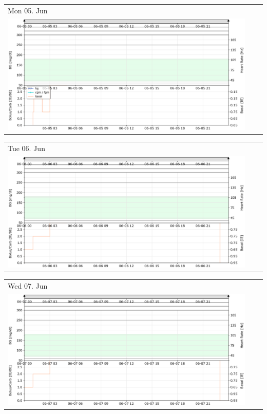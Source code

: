 \newpage

\begin{tabularx}{\linewidth}{YYY}
Mon 05. Jun\\
\includegraphics[scale=0.53,keepaspectratio,trim={0 0 0 0},clip]{plot_daily_170605.png}
\end{tabularx}

\begin{tabularx}{\linewidth}{YYY}
Tue 06. Jun\\
\includegraphics[scale=0.53,keepaspectratio,trim={0 0 0 0},clip]{plot_daily_170606.png}
\end{tabularx}

\begin{tabularx}{\linewidth}{YYY}
Wed 07. Jun\\
\includegraphics[scale=0.53,keepaspectratio,trim={0 0 0 0},clip]{plot_daily_170607.png}
\end{tabularx}

